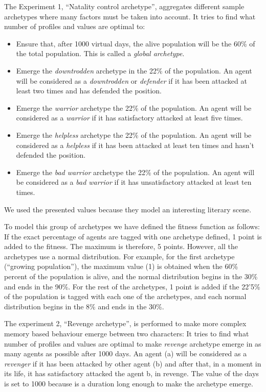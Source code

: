 \documentclass[runningheads]{llncs}
\begin{document}
The Experiment 1, ``Natality control archetype'', aggregates different sample archetypes where many factors must be taken into account.  It tries to find what number of profiles and values are optimal to:
\begin{itemize}
\item Ensure that, after 1000 virtual days, the alive population will be the 60\% of the total population. This is called a \textit{global archetype}.
\item Emerge the \textit{downtrodden} archetype in the 22\% of the
  population. An agent will be considered as a \textit{downtrodden} or
  \textit{defender} if it has been attacked at least two times and has
  defended the position. 
\item Emerge the \textit{warrior} archetype the 22\% of the population. An agent will be considered as a \textit{warrior} if it has satisfactory attacked at least five times. 
\item Emerge the \textit{helpless} archetype the 22\% of the population. An agent will be considered as a \textit{helpless}  if it has been attacked at least ten times and hasn't defended the position.
\item Emerge the \textit{bad warrior} archetype the 22\% of the population. An agent will be considered as a \textit{bad warrior}  if it has unsatisfactory attacked at least ten times.
\end{itemize}
We used the presented values because they model an interesting literary scene.

To model this group of archetypes we have defined the fitness function as follows:
If the exact percentage of agents are tagged with one archetype defined, 1 point is added to the fitness. The maximum is therefore, 5 points. However, all the archetypes use a normal distribution. For example, for the first archetype (``growing population''), the maximum value (1) is obtained when the 60\% percent of the population is alive, and the normal distribution begins in the 30\% and ends in the 90\%. For the rest of the archetypes, 1 point is added if the 22'5\% of the population is tagged with each one of the archetypes, and each normal distribution begins in the 8\% and ends in the 30\%.


The experiment 2, ``Revenge archetype'', is performed to make more complex memory based behaviour emerge between two characters:  It tries to find what number of profiles and values are optimal to make \textit{revenge} archetype emerge in as many agents as possible after 1000 days.  An agent (a) will be considered as a \textit{revenger} if it has been attacked by other agent (b) and after that, in a moment in its life, it has satisfactory attacked the agent b, in revenge. The value of the days is set to 1000 because is a duration long enough to make the archetype emerge.
\end{document}
